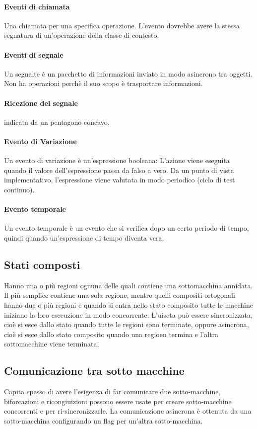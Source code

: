 \paragraph*{Eventi di chiamata} Una chiamata per una specifica operazione.
L'evento dovrebbe avere la stessa segnatura di un'operazione della classe di contesto.
\paragraph*{Eventi di segnale} Un segnalte è un pacchetto di informazioni inviato in modo
asincrono tra oggetti. Non ha operazioni perchè il suo scopo è trasportare informazioni.
\paragraph*{Ricezione del segnale} indicata da un pentagono concavo.
\paragraph*{Evento di Variazione} Un evento di variazione è un'espressione booleana:
L'azione viene eseguita quando il valore dell'espressione passa da falso a vero.
Da un punto di vista implementativo, l'espressione viene valutata in modo periodico (ciclo di test continuo).
\paragraph*{Evento temporale} Un evento temporale è un evento che si verifica dopo un certo periodo di tempo,
quindi quando un'espressione di tempo diventa vera.
\subsection*{Stati composti}
Hanno una o più regioni ognuna delle quali contiene una sottomacchina annidata.
\\ Il più semplice contiene una sola regione, mentre quelli compositi ortogonali hanno
due o più regioni e quando si entra nello stato composito tutte le macchine iniziano la loro esecuzione
in modo concorrente. L'uiscta può essere sincronizzata, cioè si esce dallo stato quando tutte le regioni sono
terminate, oppure asincrona, cioè si esce dallo stato composito quando una regioen termina e l'altra
sottomacchine viene terminata.
\subsection*{Comunicazione tra sotto macchine}
Capita spesso di avere l'esigenza di far comunicare due sotto-macchine, biforcazioni e
ricongiuizioni possono essere usate per creare sotto-macchine concorrenti e per ri-sincronizzarle.
La comunicazione asincrona è ottenuta da una sotto-macchina configurando un flag per un'altra sotto-macchina.
